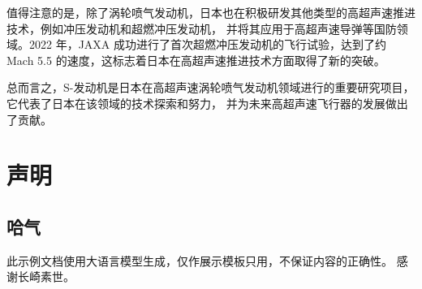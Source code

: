 \documentclass{pkuthesis}
\begin{document}
值得注意的是，除了涡轮喷气发动机，日本也在积极研发其他类型的高超声速推进技术，例如冲压发动机和超燃冲压发动机，
并将其应用于高超声速导弹等国防领域。2022 年，JAXA 成功进行了首次超燃冲压发动机的飞行试验，达到了约 Mach 5.5
的速度，这标志着日本在高超声速推进技术方面取得了新的突破。

总而言之，S-发动机是日本在高超声速涡轮喷气发动机领域进行的重要研究项目，它代表了日本在该领域的技术探索和努力，
并为未来高超声速飞行器的发展做出了贡献。
\printbibliography
\Appendix
\section{声明}
\subsection{哈气}
此示例文档使用大语言模型生成，仅作展示模板只用，不保证内容的正确性。
\Acknowledgments
感谢长崎素世。
\end{document}
